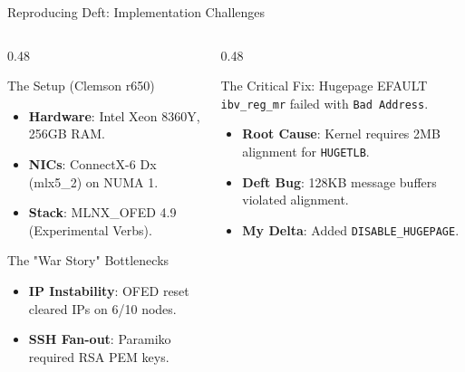 \documentclass[aspectratio=169,10pt]{beamer}
\newcommand{\hl}[1]{\textcolor{VTMaroon}{\textbf{#1}}}
\newcommand{\sys}[1]{\texttt{#1}}
\begin{document}
\begin{frame}[t]{Reproducing Deft: Implementation Challenges}
\begin{columns}[T,onlytextwidth]
\begin{column}{0.48\textwidth}
\begin{block}{The Setup (Clemson r650)}
\begin{itemize}
    \item \hl{Hardware}: Intel Xeon 8360Y, 256GB RAM.
    \item \hl{NICs}: ConnectX-6 Dx (mlx5\_2) on NUMA 1.
    \item \hl{Stack}: MLNX\_OFED 4.9 (Experimental Verbs).
\end{itemize}
\end{block}

\begin{alertblock}{The "War Story" Bottlenecks}
\begin{itemize}
    \item \textbf{IP Instability}: OFED reset cleared IPs on 6/10 nodes.
    \item \textbf{SSH Fan-out}: Paramiko required RSA PEM keys.
\end{itemize}
\end{alertblock}
\end{column}

\begin{column}{0.48\textwidth}
\begin{exampleblock}{The Critical Fix: Hugepage EFAULT}
\sys{ibv\_reg\_mr} failed with \texttt{Bad Address}.
\begin{itemize}
    \item \hl{Root Cause}: Kernel requires 2MB alignment for \texttt{HUGETLB}.
    \item \hl{Deft Bug}: 128KB message buffers violated alignment.
    \item \hl{My Delta}: Added \sys{DISABLE\_HUGEPAGE}.
\end{itemize}
\end{exampleblock}
\end{column}
\end{columns}
\end{frame}
\end{document}
